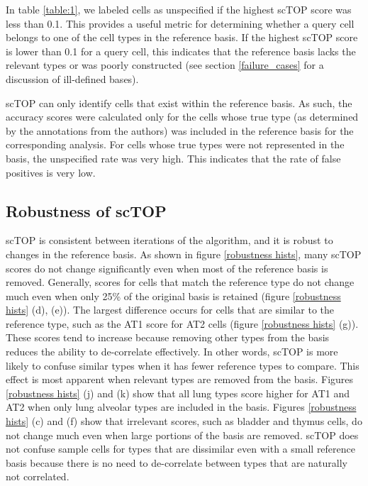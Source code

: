 \documentclass[aps,superscriptaddress, notitlepage,longbibliography]{revtex4-1}
\begin{document}
In table \ref{table:1}, we labeled cells as unspecified if the highest scTOP score was less than 0.1. This provides a useful metric for determining whether a query cell belongs to one of the cell types in the reference basis. If the highest scTOP score is lower than 0.1 for a query cell, this indicates that the reference basis lacks the relevant types or was poorly constructed (see section \ref{failure_cases} for a discussion of ill-defined bases). 

scTOP can only identify cells that exist within the reference basis. As such, the accuracy scores were calculated only for the cells whose true type (as determined by the annotations from the authors) was included in the reference basis for the corresponding analysis. For cells whose true types were not represented in the basis, the unspecified rate was very high. This indicates that the rate of false positives is very low.

\subsection{Robustness of scTOP}
scTOP is consistent between iterations of the algorithm, and it is robust to changes in the reference basis. As shown in figure \ref{robustness hists}, many scTOP scores do not change significantly even when most of the reference basis is removed. Generally, scores for cells that match the reference type do not change much even when only 25\% of the original basis is retained (figure \ref{robustness hists} (d), (e)). The largest difference occurs for cells that are similar to the reference type, such as the AT1 score for AT2 cells (figure \ref{robustness hists} (g)). These scores tend to increase because removing other types from the basis reduces the ability to de-correlate effectively. In other words, scTOP is more likely to confuse similar types when it has fewer reference types to compare. This effect is most apparent when relevant types are removed from the basis. Figures \ref{robustness hists} (j) and (k) show that all lung types score higher for AT1 and AT2 when only lung alveolar types are included in the basis. Figures \ref{robustness hists} (c) and (f) show that irrelevant scores, such as bladder and thymus cells, do not change much even when large portions of the basis are removed. scTOP does not confuse sample cells for types that are dissimilar even with a small reference basis because there is no need to de-correlate between types that are naturally not correlated.
\end{document}
